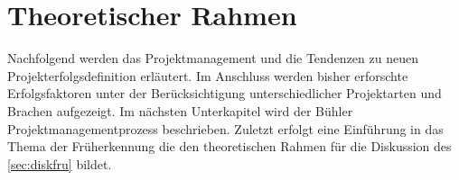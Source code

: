 \chapter{Theoretischer Rahmen}\label{sec:theor}
Nachfolgend werden das Projektmanagement und die Tendenzen zu neuen Projekterfolgsdefinition erläutert. Im Anschluss werden bisher erforschte Erfolgsfaktoren unter der Berücksichtigung unterschiedlicher Projektarten und Brachen aufgezeigt. Im nächsten Unterkapitel wird der Bühler Projektmanagementprozess beschrieben. Zuletzt erfolgt eine Einführung in das Thema der Früherkennung die den theoretischen Rahmen für die Diskussion des \ref{sec:diskfru} bildet.
